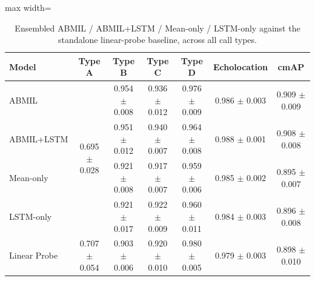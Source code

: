 \begin{table}[htbp]
\centering
\caption{Ensembled ABMIL / ABMIL+LSTM / Mean-only / LSTM-only against the standalone linear-probe baseline, across all call types.}
\label{tab:ensemble_comparison}
\begin{adjustbox}{max width=\textwidth}
\begin{tabular}{l ccccc c}
\toprule
Model & Type A & Type B & Type C & Type D & Echolocation & cmAP \\
\midrule
ABMIL & \multirow{4}{*}{0.695 $\pm$ 0.028} & 0.954 $\pm$ 0.008 & 0.936 $\pm$ 0.012 & 0.976 $\pm$ 0.009 & 0.986 $\pm$ 0.003 & 0.909 $\pm$ 0.009 \\
ABMIL+LSTM &  & 0.951 $\pm$ 0.012 & 0.940 $\pm$ 0.007 & 0.964 $\pm$ 0.008 & 0.988 $\pm$ 0.001 & 0.908 $\pm$ 0.008 \\
Mean-only &  & 0.921 $\pm$ 0.008 & 0.917 $\pm$ 0.007 & 0.959 $\pm$ 0.006 & 0.985 $\pm$ 0.002 & 0.895 $\pm$ 0.007 \\
LSTM-only &  & 0.921 $\pm$ 0.017 & 0.922 $\pm$ 0.009 & 0.960 $\pm$ 0.011 & 0.984 $\pm$ 0.003 & 0.896 $\pm$ 0.008 \\
\midrule
Linear Probe & 0.707 $\pm$ 0.054 & 0.903 $\pm$ 0.006 & 0.920 $\pm$ 0.010 & 0.980 $\pm$ 0.005 & 0.979 $\pm$ 0.003 & 0.898 $\pm$ 0.010 \\
\bottomrule
\end{tabular}
\end{adjustbox}
\end{table}
